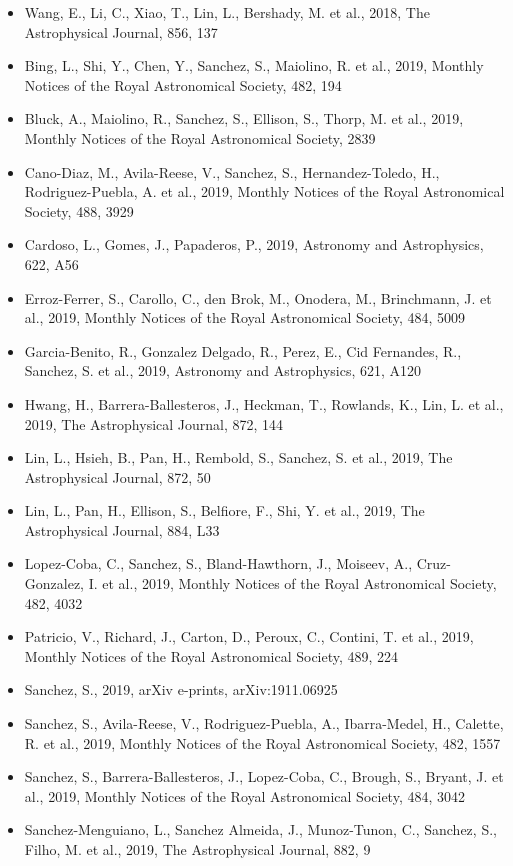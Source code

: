 \documentclass{letter}
\begin{document}
\begin{enumerate}
\begin{itemize}
\item Wang, E., Li, C., Xiao, T., Lin, L., Bershady, M. et al., 2018, The Astrophysical Journal, 856, 137
\item Bing, L., Shi, Y., Chen, Y., Sanchez, S., Maiolino, R. et al., 2019, Monthly Notices of the Royal Astronomical Society, 482, 194
\item Bluck, A., Maiolino, R., Sanchez, S., Ellison, S., Thorp, M. et al., 2019, Monthly Notices of the Royal Astronomical Society, 2839
\item Cano-Diaz, M., Avila-Reese, V., Sanchez, S., Hernandez-Toledo, H., Rodriguez-Puebla, A. et al., 2019, Monthly Notices of the Royal Astronomical Society, 488, 3929
\item Cardoso, L., Gomes, J., Papaderos, P., 2019, Astronomy and Astrophysics, 622, A56
\item Erroz-Ferrer, S., Carollo, C., den Brok, M., Onodera, M., Brinchmann, J. et al., 2019, Monthly Notices of the Royal Astronomical Society, 484, 5009
\item Garcia-Benito, R., Gonzalez Delgado, R., Perez, E., Cid Fernandes, R., Sanchez, S. et al., 2019, Astronomy and Astrophysics, 621, A120
\item Hwang, H., Barrera-Ballesteros, J., Heckman, T., Rowlands, K., Lin, L. et al., 2019, The Astrophysical Journal, 872, 144
\item Lin, L., Hsieh, B., Pan, H., Rembold, S., Sanchez, S. et al., 2019, The Astrophysical Journal, 872, 50
\item Lin, L., Pan, H., Ellison, S., Belfiore, F., Shi, Y. et al., 2019, The Astrophysical Journal, 884, L33
\item Lopez-Coba, C., Sanchez, S., Bland-Hawthorn, J., Moiseev, A., Cruz-Gonzalez, I. et al., 2019, Monthly Notices of the Royal Astronomical Society, 482, 4032
\item Patricio, V., Richard, J., Carton, D., Peroux, C., Contini, T. et al., 2019, Monthly Notices of the Royal Astronomical Society, 489, 224
\item Sanchez, S., 2019, arXiv e-prints, arXiv:1911.06925
\item Sanchez, S., Avila-Reese, V., Rodriguez-Puebla, A., Ibarra-Medel, H., Calette, R. et al., 2019, Monthly Notices of the Royal Astronomical Society, 482, 1557
\item Sanchez, S., Barrera-Ballesteros, J., Lopez-Coba, C., Brough, S., Bryant, J. et al., 2019, Monthly Notices of the Royal Astronomical Society, 484, 3042
\item Sanchez-Menguiano, L., Sanchez Almeida, J., Munoz-Tunon, C., Sanchez, S., Filho, M. et al., 2019, The Astrophysical Journal, 882, 9

\end{itemize}
\end{enumerate}
\end{document}
